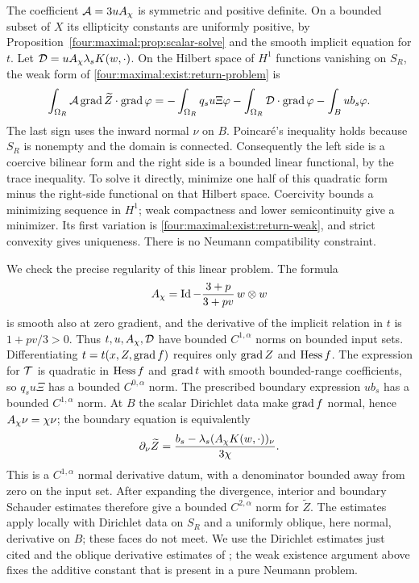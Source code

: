 The coefficient $\mathcal A=3uA_\chi$ is symmetric and positive
definite.  On a bounded subset of $X$ its ellipticity constants are
uniformly positive, by Proposition~\ref{four:maximal:prop:scalar-solve} and the
smooth implicit equation for $t$.  Let
$\mathcal D=uA_\chi\lambda_sK(w,\cdot)$.
On the Hilbert space of $H^1$ functions vanishing on $S_R$, the weak
form of \eqref{four:maximal:exist:return-problem} is
\begin{equation}\label{four:maximal:exist:return-weak}
 \int_{\Omega_R}\mathcal A\operatorname{grad}\widetilde Z\cdot\operatorname{grad}\varphi
 =-\int_{\Omega_R}q_su\Xi\varphi
  -\int_{\Omega_R}\mathcal D\cdot\operatorname{grad}\varphi
  -\int_Bub_s\varphi.
\end{equation}
The last sign uses the inward normal $\nu$ on $B$.
Poincar\'e's inequality holds because $S_R$ is nonempty and the
domain is connected.  Consequently the left side is a coercive
bilinear form and the right side is a bounded linear functional,
by the trace inequality.  To solve it directly, minimize one half
of this quadratic form minus the right-side functional on that
Hilbert space.  Coercivity bounds a minimizing sequence in $H^1$;
weak compactness and lower semicontinuity give a minimizer.  Its first
variation is \eqref{four:maximal:exist:return-weak}, and strict convexity gives
uniqueness.  There is no Neumann compatibility constraint.

We check the precise regularity of this linear problem.  The formula
\[
 A_\chi=\operatorname{Id}-\frac{3+p}{3+pv}\,w\otimes w
\]
is smooth also at zero gradient, and the derivative of the implicit
relation in $t$ is $1+pv/3>0$.
Thus $t,u,A_\chi,\mathcal D$ have bounded $C^{1,\alpha}$ norms on
bounded input sets.  Differentiating $t=t(x,Z,\operatorname{grad} f)$ requires only
$\operatorname{grad} Z$ and $\operatorname{Hess} f$.  The expression for $\mathcal T$ is quadratic in
$\operatorname{Hess} f$ and $\operatorname{grad} t$ with smooth bounded-range coefficients,
so $q_su\Xi$ has a bounded $C^{0,\alpha}$ norm.  The prescribed
boundary expression $ub_s$ has a bounded $C^{1,\alpha}$ norm.
At $B$ the scalar Dirichlet data make $\operatorname{grad} f$ normal, hence
$A_\chi\nu=\chi\nu$; the boundary equation is equivalently
\begin{equation}\label{four:maximal:exist:return-normal}
 \partial_\nu\widetilde Z
  =\frac{b_s-\lambda_s(A_\chi K(w,\cdot))_\nu}{3\chi}.
\end{equation}
This is a $C^{1,\alpha}$ normal derivative datum, with a denominator
bounded away from zero on the input set.
After expanding the divergence, interior and boundary Schauder
estimates therefore give a bounded $C^{2,\alpha}$ norm for
$\widetilde Z$.  The estimates apply locally with Dirichlet data on
$S_R$ and a uniformly oblique, here normal, derivative on $B$;
these faces do not meet.  We use the Dirichlet estimates just cited
and the oblique derivative estimates of
\cite[Theorem~6.30, p.~127]{GilbargTrudinger2001}; the weak existence argument above fixes
the additive constant that is present in a pure Neumann problem.

